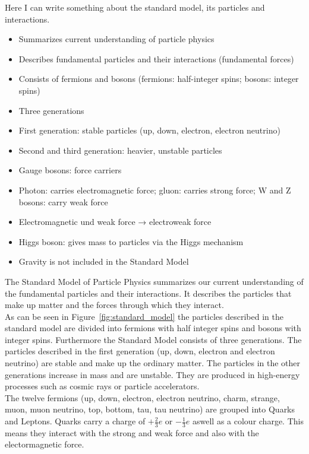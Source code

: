 Here I can write something about the standard model, its particles and interactions.

\begin{itemize}[noitemsep]
    \item Summarizes current understanding of particle physics
    \item Describes fundamental particles and their interactions (fundamental forces)
    \item Consists of fermions and bosons (fermions: half-integer spins; bosons: integer spins)
    \item Three generations
    \item First generation: stable particles (up, down, electron, electron neutrino)
    \item Second and third generation: heavier, unstable particles
    \item Gauge bosons: force carriers
    \item Photon: carries electromagnetic force; gluon: carries strong force; W and Z bosons: carry weak force
    \item Electromagnetic und weak force → electroweak force
    \item Higgs boson: gives mass to particles via the Higgs mechanism
    \item Gravity is not included in the Standard Model
\end{itemize}
The Standard Model of Particle Physics summarizes our current understanding of the fundamental particles and their interactions. 
It describes the particles that make up matter and the forces through which they interact.\\
As can be seen in Figure~\ref{fig:standard_model} the particles described in the standard model are divided into fermions with half integer spins and bosons with integer spins. 
Furthermore the Standard Model consists of three generations. The particles described in the first generation (up, down, electron and electron neutrino) are stable and make up the ordinary matter. The particles in the other generations increase in mass and are unstable. They are produced in high-energy processes such as cosmic rays or particle accelerators.\\
The twelve  fermions (up, down, electron, electron neutrino, charm, strange, muon, muon neutrino, top, bottom, tau, tau neutrino) are grouped into Quarks and Leptons. 
Quarks carry a charge of $+\frac{2}{3}e$ or $-\frac{1}{3}e$ aswell as a colour charge. This means they interact with the strong and weak force and also with the electormagnetic force. 
